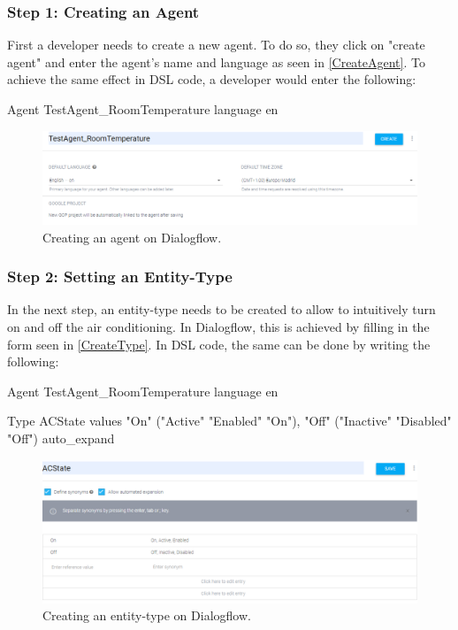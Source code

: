 \subsubsection{Step 1: Creating an Agent}
First a developer needs to create a new agent. To do so, they click on "create agent" and enter the agent's name and language as seen in \autoref{CreateAgent}.
To achieve the same effect in DSL code, a developer would enter the following:
\begin{samepage}
    \begin{DSL}
        Agent TestAgent_RoomTemperature
            language en 
    \end{DSL}
\end{samepage}

\begin{figure}[!htb]
    \centering
    \includegraphics[width=1\textwidth]{Thesis_Images/CreateAgent.PNG}
    \caption{Creating an agent on Dialogflow.}
        \label{CreateAgent}
\end{figure}

\subsubsection{Step 2: Setting an Entity-Type}
In the next step, an entity-type needs to be created to allow to intuitively turn on and off the air conditioning.
In Dialogflow, this is achieved by filling in the form seen in \autoref{CreateType}.
In DSL code, the same can be done by writing the following:
\begin{samepage}    
    \begin{DSL}
        Agent TestAgent_RoomTemperature
            language en 
        
            Type ACState
                values 
                    "On" ("Active" "Enabled" "On"),
                    "Off" ("Inactive" "Disabled" "Off")
                auto_expand
    \end{DSL}
\end{samepage}

\begin{figure}[!htb]
    \centering
    \includegraphics[width=1\textwidth]{Thesis_Images/CreateType.PNG}
    \caption{Creating an entity-type on Dialogflow.}
        \label{CreateType}
\end{figure}

